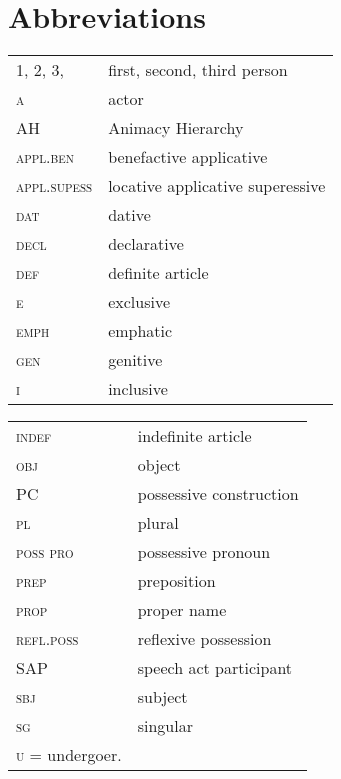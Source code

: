 \documentclass[output=paper]{LSP/langsci}
\begin{document}
\section*{Abbreviations}
\begin{tabularx}{.45\textwidth}{lX}
1, 2, 3, & first, second, third person\\
\textsc{a} & actor \\
 AH & Animacy Hierarchy\\
 \textsc{appl.ben} & benefactive applicative \\
 \textsc{appl.supess} & locative applicative superessive \\
 \textsc{dat} & dative \\
 \textsc{decl} & declarative \\
 \textsc{def} & definite article \\
 \textsc{e} & exclusive \\
 \textsc{emph} & emphatic \\
 \textsc{gen} & genitive \\
 \textsc{i} & inclusive \\
\end{tabularx}
\begin{tabularx}{.45\textwidth}{lX}
 \textsc{indef} & indefinite article \\
 \textsc{obj} & {object} \\
 PC & {possessive construction}\\
 \textsc{pl} & plural \\
 \textsc{poss pro} & {possessive pronoun} \\
 \textsc{prep} & preposition \\
 \textsc{prop} & proper name \\
 \textsc{refl.poss} & reflexive possession \\
 SAP & speech act participant\\
 \textsc{sbj} & {subject} \\
 \textsc{sg} & singular \\
 \textsc{u} = undergoer.
 
\end{tabularx}

 \printbibliography[heading=subbibliography,notkeyword=this]
 
\end{document}
